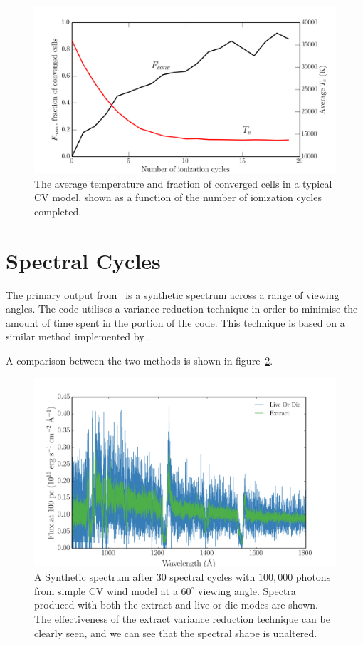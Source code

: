 \begin{figure}
\centering
\includegraphics[width=1.0\textwidth]{figures/03-radtrans/graph_conv.png}
\caption
{
The average temperature and fraction of converged cells in
a typical CV model, shown as a function of the number of ionization cycles
completed. 
} 
\label{fig:conv}
\end{figure}




\section{Spectral Cycles}
\label{sec:spectral_cycles}
The primary output from \py\ is a synthetic spectrum 
across a range of viewing angles. The code utilises a variance 
reduction technique in order to minimise the amount of 
time spent in the portion of the code. This technique is based 
on a similar method implemented by \citep{woods1991}.






A comparison between the two methods is shown in figure~\ref{fig:extract_demo}.

\begin{figure}
\centering
\includegraphics[width=1.0\textwidth]{figures/03-radtrans/extract_demo.png}
\caption
{
A Synthetic spectrum after $30$ spectral cycles with $100,000$ photons
from simple CV wind model at a $60^\circ$ viewing angle.
Spectra produced with both the extract and live or die modes
are shown. The effectiveness of the extract variance reduction technique can
be clearly seen, and we can see that the spectral shape is unaltered.
} 
\label{fig:extract_demo}
\end{figure}




